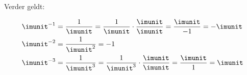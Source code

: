 Verder geldt:

\begin{equation}
\begin{split}
\imunit^{-1} &= \dfrac{1}{\imunit} = \dfrac{1}{\imunit}\cdot\dfrac{\imunit}{\imunit} = \dfrac{\imunit}{-1} = -\imunit \\
\imunit^{-2} &= \dfrac{1}{\imunit^2} = -1 \\
\imunit^{-3} &= \dfrac{1}{\imunit^3} = \dfrac{1}{\imunit^3}\cdot\dfrac{\imunit}{\imunit} = \dfrac{\imunit}{1} = \imunit
\end{split}
\end{equation}
